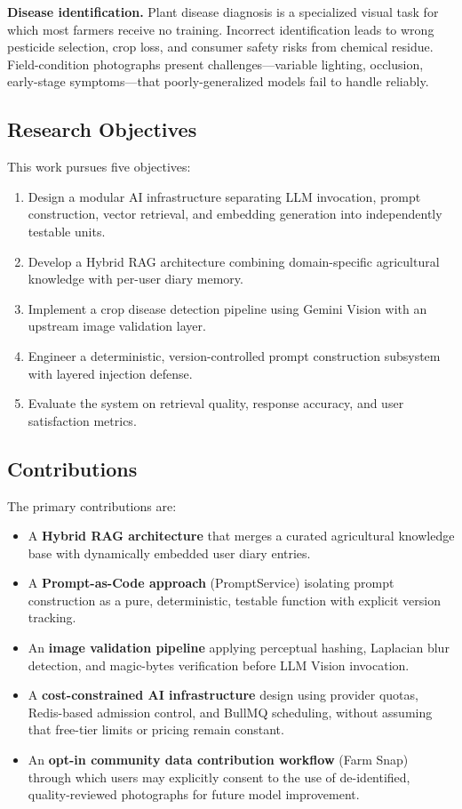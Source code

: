 \documentclass[conference]{IEEEtran}
\begin{document}
\textbf{Disease identification.} Plant disease diagnosis is a specialized visual task for which most farmers receive no training. Incorrect identification leads to wrong pesticide selection, crop loss, and consumer safety risks from chemical residue. Field-condition photographs present challenges---variable lighting, occlusion, early-stage symptoms---that poorly-generalized models fail to handle reliably.

\subsection{Research Objectives}

This work pursues five objectives:
\begin{enumerate}
    \item Design a modular AI infrastructure separating LLM invocation, prompt construction, vector retrieval, and embedding generation into independently testable units.
    \item Develop a Hybrid RAG architecture combining domain-specific agricultural knowledge with per-user diary memory.
    \item Implement a crop disease detection pipeline using Gemini Vision with an upstream image validation layer.
    \item Engineer a deterministic, version-controlled prompt construction subsystem with layered injection defense.
    \item Evaluate the system on retrieval quality, response accuracy, and user satisfaction metrics.
\end{enumerate}

\subsection{Contributions}

The primary contributions are:
\begin{itemize}
    \item A \textbf{Hybrid RAG architecture} that merges a curated agricultural knowledge base with dynamically embedded user diary entries.
    \item A \textbf{Prompt-as-Code approach} (PromptService) isolating prompt construction as a pure, deterministic, testable function with explicit version tracking.
    \item An \textbf{image validation pipeline} applying perceptual hashing, Laplacian blur detection, and magic-bytes verification before LLM Vision invocation.
    \item A \textbf{cost-constrained AI infrastructure} design using provider quotas, Redis-based admission control, and BullMQ scheduling, without assuming that free-tier limits or pricing remain constant.
    \item An \textbf{opt-in community data contribution workflow} (Farm Snap) through which users may explicitly consent to the use of de-identified, quality-reviewed photographs for future model improvement.
\end{itemize}
\end{document}
